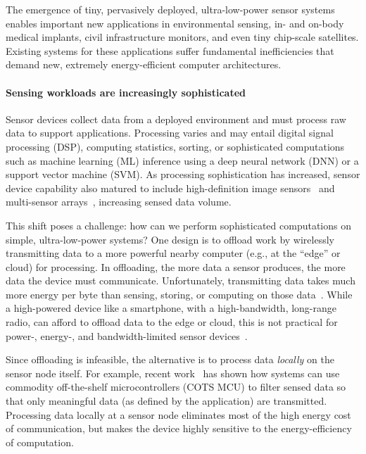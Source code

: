 The emergence of tiny, pervasively deployed, ultra-low-power sensor systems
enables important new applications in environmental sensing, in- and on-body
medical implants, civil infrastructure monitors, and even tiny chip-scale
satellites.
%
Existing systems for these applications suffer fundamental
inefficiencies that demand new, extremely energy-efficient computer
architectures. 

\paragraph{Sensing workloads are increasingly sophisticated}
Sensor devices collect data from a deployed environment and must process raw
data to support applications.  Processing varies and may entail digital signal
processing (DSP), computing statistics, sorting, or sophisticated computations
such as machine learning (ML) inference using a deep neural network (DNN) or a
support vector machine (SVM).
%
As processing sophistication has increased, sensor device capability also
matured to include high-definition image sensors~\cite{naderiparizi2018towards} and
multi-sensor arrays~\cite{laput2017synthetic}, increasing sensed data volume. 

This shift poses a challenge: how can we perform sophisticated computations
on simple, ultra-low-power systems?
One design is 
to offload work by wirelessly transmitting data to a more powerful
nearby computer (e.g., at the ``edge'' or cloud) for processing.  
%
In offloading, the more data a sensor produces, the more data the device must
communicate. 
%
Unfortunately, transmitting data takes much more energy per byte than
sensing, storing, or computing on those data~\cite{sonic,zebranet}.  
%
While a high-powered device like a smartphone, with a high-bandwidth,
long-range radio, can afford to offload data to the edge or cloud,
this is not practical for power-, energy-, and bandwidth-limited sensor devices~\cite{dongare2017openchirp,sonic}.

Since offloading is infeasible,
the alternative is to process data \emph{locally} on the sensor node itself.
%
For example, recent work~\cite{sonic} has shown how systems can use commodity off-the-shelf microcontrollers (COTS MCU)
to filter sensed data so that only meaningful data (as defined by the application) are transmitted.
%
Processing data locally at a sensor node eliminates most of the high energy
cost of communication,
but makes the device highly sensitive to the energy-efficiency of computation.
%

